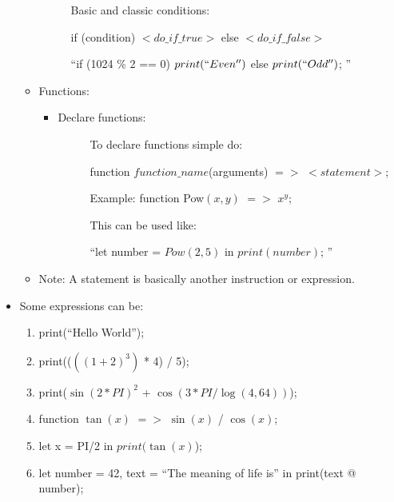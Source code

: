 \begin{itemize}
\begin{itemize}
\begin{description}
                        \item[] Basic and classic conditions:
                        \item[] if (condition) $<do\_if\_true>$ else $<do\_if\_false>$
                        \item[] ``if (1024 \% 2 == 0) $print(``Even'')$ else $print(``Odd'')$; ''
                    \end{description}
                \item Functions:
                    \begin{itemize}
                        \item Declare functions:
                        \begin{description}
                            \item[] To declare functions simple do:
                            \item[] function $function\_name${(arguments)} $=>$ $<statement>$;
                            \item[] Example: function Pow$(x,y)$ $=>$ $x^y$;
                            \item[] This can be used like:
                            \item[] ``let number = $Pow(2,5)$ in $print(number)$; ''
                        \end{description}
                    \end{itemize}
                \item Note: A statement is basically another instruction or expression.
            \end{itemize}
        \newpage
        \item Some expressions can be:
            \begin{enumerate}
                \item print{(``Hello World'')};
                \item print{(($({(1 + 2)} ^ 3)$ * 4) / 5)};
                \item print{($\sin{(2 * PI)}^2$ + $\cos(3 * PI / \log(4, 64))$)};
                \item function $\tan{{(x)}}$ $=>$ $\sin{{(x)}}$ / $\cos{{(x)}}$;
                \item let x = PI/2 in $print(\tan{(x)}$);
                \item let number = 42, text = ``The meaning of life is'' in print{(text @ number)};
                    \begin{itemize}

\end{itemize}
\end{enumerate}
\end{itemize}
